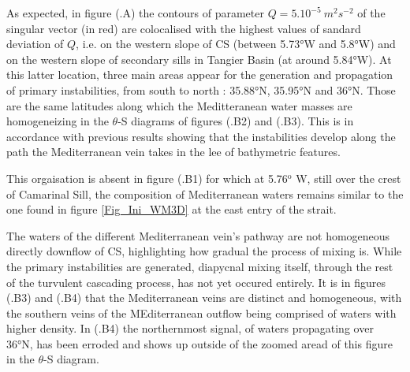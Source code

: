 As expected, in figure (.A) the contours of parameter $Q= 5.10^{-5}\ m^2s^{-2}$ of the singular vector (in red) are colocalised with the highest values of sandard deviation of $Q$, i.e. on the western slope of CS (between 5.73°W and 5.8°W) and on the western slope of secondary sills in Tangier Basin (at around 5.84°W). At this latter location, three main areas appear for the generation and propagation of primary instabilities, from south to north : 35.88°N, 35.95°N and 36°N. Those are the same latitudes along which the Meditteranean water masses are homogeneizing in the $\theta$-S diagrams of figures (.B2) and (.B3). This is in accordance with previous results showing that the instabilities develop along the path the Mediterranean vein takes in the lee of bathymetric features. 

This orgaisation is absent in figure (.B1) for which at 5.76$^{\text{o}}$ W, still over the crest of Camarinal Sill, the composition of Mediterranean waters remains similar to the one found in figure \ref{Fig_Ini_WM3D} at the east entry of the strait.

The waters of the different Mediterranean vein's pathway are not homogeneous directly downflow of CS, highlighting how gradual the process of mixing is. While the primary instabilities are generated, diapycnal mixing itself, through the rest of the turvulent cascading process, has not yet occured entirely. It is in figures (.B3) and (.B4) that the Mediterranean veins are distinct and homogeneous, with the southern veins of the MEditerranean outflow being comprised of waters with higher density. In (.B4) the northernmost signal, of waters propagating  over 36°N, has been erroded and shows up outside of the zoomed aread of this figure in the $\theta$-S diagram. 

